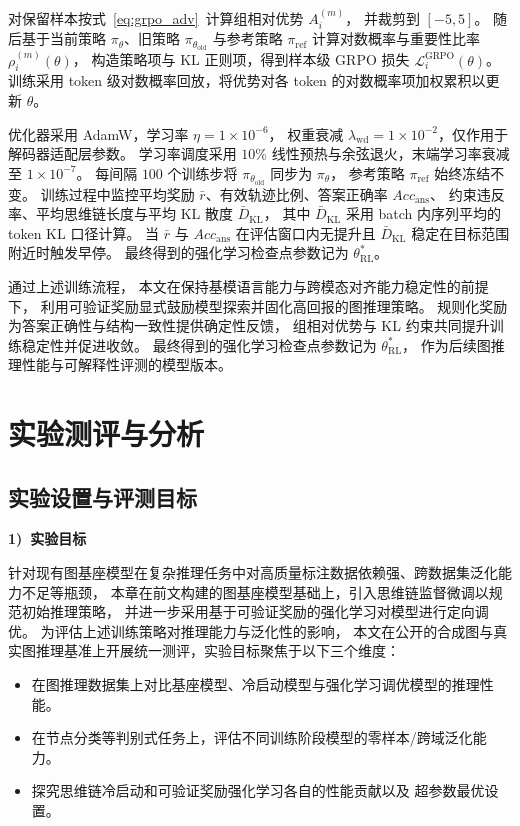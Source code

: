 对保留样本按式~\ref{eq:grpo_adv}\ 计算组相对优势 $A_i^{(m)}$，
并裁剪到 $[-5,5]$。
随后基于当前策略 $\pi_\theta$、旧策略 $\pi_{\theta_{\mathrm{old}}}$ 与参考策略 $\pi_{\mathrm{ref}}$
计算对数概率与重要性比率 $\rho_i^{(m)}(\theta)$，
构造策略项与 KL 正则项，得到样本级 GRPO 损失 $\mathcal{L}^{\mathrm{GRPO}}_i(\theta)$。
训练采用 token 级对数概率回放，将优势对各 token 的对数概率项加权累积以更新 $\theta$。

优化器采用 AdamW，学习率 $\eta=1\times10^{-6}$，
权重衰减 $\lambda_{\mathrm{wd}}=1\times10^{-2}$，仅作用于解码器适配层参数。
学习率调度采用 $10\%$ 线性预热与余弦退火，末端学习率衰减至 $1\times10^{-7}$。
每间隔 $100$ 个训练步将 $\pi_{\theta_{\mathrm{old}}}$ 同步为 $\pi_\theta$，
参考策略 $\pi_{\mathrm{ref}}$ 始终冻结不变。
训练过程中监控平均奖励 $\bar r$、有效轨迹比例、答案正确率 $Acc_{\mathrm{ans}}$、
约束违反率、平均思维链长度与平均 KL 散度 $\bar D_{\mathrm{KL}}$，
其中 $\bar D_{\mathrm{KL}}$ 采用 batch 内序列平均的 token KL 口径计算。
当 $\bar r$ 与 $Acc_{\mathrm{ans}}$ 在评估窗口内无提升且 $\bar D_{\mathrm{KL}}$ 稳定在目标范围附近时触发早停。
最终得到的强化学习检查点参数记为 $\theta_{\mathrm{RL}}^\ast$。


通过上述训练流程，
本文在保持基模语言能力与跨模态对齐能力稳定性的前提下，
利用可验证奖励显式鼓励模型探索并固化高回报的图推理策略。
规则化奖励为答案正确性与结构一致性提供确定性反馈，
组相对优势与 KL 约束共同提升训练稳定性并促进收敛。
最终得到的强化学习检查点参数记为 $\theta_{\mathrm{RL}}^\ast$，
作为后续图推理性能与可解释性评测的模型版本。




\section{实验测评与分析}
\subsection{实验设置与评测目标}
\textbf{1)\ 实验目标}

针对现有图基座模型在复杂推理任务中对高质量标注数据依赖强、跨数据集泛化能力不足等瓶颈，
本章在前文构建的图基座模型基础上，引入思维链监督微调以规范初始推理策略，
并进一步采用基于可验证奖励的强化学习对模型进行定向调优。
为评估上述训练策略对推理能力与泛化性的影响，
本文在公开的合成图与真实图推理基准上开展统一测评，实验目标聚焦于以下三个维度：
\begin{itemize}
  \item 在图推理数据集上对比基座模型、冷启动模型与强化学习调优模型的推理性能。
  \item 在节点分类等判别式任务上，评估不同训练阶段模型的零样本/跨域泛化能力。
  \item 探究思维链冷启动和可验证奖励强化学习各自的性能贡献以及
  超参数最优设置。
\end{itemize}

